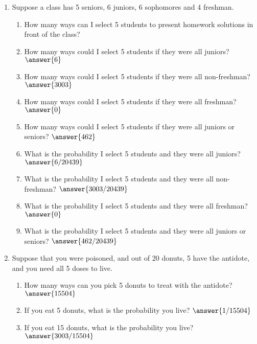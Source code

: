 \documentclass{ximera}
\begin{document}
\begin{enumerate}
\item Suppose a class has 5 seniors, 6 juniors, 6 sophomores and 4 freshman.
\begin{enumerate}
\item How many ways can I select 5 students to present homework solutions in front of the class? 
\item How many ways could I select 5 students if they were all juniors? $\answer{6}$
\item How many ways could I select 5 students if they were all non-freshman? $\answer{3003}$
\item How many ways could I select 5 students if they were all freshman? $\answer{0}$
\item How many ways could I select 5 students if they were all juniors or seniors? $\answer{462}$
\item What is the probability I select 5 students and they were all juniors? $\answer{6/20439}$
\item What is the probability I select 5 students and they were all non-freshman? $\answer{3003/20439}$
\item What is the probability I select 5 students and they were all freshman? $\answer{0}$
\item What is the probability I select 5 students and they were all juniors or seniors? $\answer{462/20439}$

\end{enumerate}

\item Suppose that you were poisoned, and out of 20 donuts, 5 have the antidote, and you need all 5 doses to live. 

\begin{enumerate}
\item How many ways can you pick 5 donuts to treat with the antidote? $\answer{15504}$
\item If you eat 5 donuts, what is the probability you live? $\answer{1/15504}$
\item If you eat 15 donuts, what is the probability you live? $\answer{3003/15504}$
\end{enumerate}
 


\end{enumerate}

 
 
      
\end{document}
